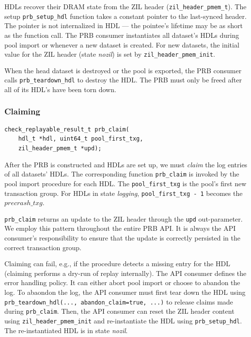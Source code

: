 \documentclass[12pt,a4paper,twoside]{book}
\begin{document}
HDLs recover their DRAM state from the ZIL header (\lstinline{zil_header_pmem_t}).
The setup \lstinline{prb_setup_hdl} function takes a constant pointer to the last-synced header.
The pointer is not internalized in HDL --- the pointee's lifetime may be as short as the function call.
The PRB consumer instantiates all dataset's HDLs during pool import or whenever a new dataset is created.
For new datasets, the initial value for the ZIL header (state \textit{nozil}) is set by \lstinline{zil_header_pmem_init}.

When the head dataset is destroyed or the pool is exported, the PRB consumer calls \lstinline{prb_teardown_hdl} to destroy the HDL.
The PRB must only be freed after all of its HDL's have been torn down.

\subsubsection{Claiming}\label{di:prb:api:claiming}

\begin{lstlisting}
check_replayable_result_t prb_claim(
    hdl_t *hdl, uint64_t pool_first_txg,
    zil_header_pmem_t *upd);
\end{lstlisting}

After the PRB is constructed and HDLs are set up, we must \textit{claim} the log entries of all datasets' HDLs.
The corresponding function \lstinline{prb_claim} is invoked by the pool import procedure for each HDL.
The \lstinline{pool_first_txg} is the pool's first new transaction group.
For HDLs in state \textit{logging}, \lstinline{pool_first_txg - 1} becomes the $precrash\_txg$.

\lstinline{prb_claim} returns an update to the ZIL header through the \lstinline{upd} out-parameter.
We employ this pattern throughout the entire PRB API.
It is always the API consumer's responsibility to ensure that the update is correctly persisted in the correct transaction group.

Claiming can fail, e.g., if the procedure detects a missing entry for the HDL (claiming performs a dry-run of replay internally).
The API consumer defines the error handling policy.
It can either abort pool import or choose to abandon the log.
To abaondon the log, the API consumer must first tear down the HDL using \lstinline{prb_teardown_hdl(..., abandon_claim=true, ...)} to release claims made during \lstinline{prb_claim}.
Then, the API consumer can reset the ZIL header content using \lstinline{zil_header_pmem_init} and re-instantiate the HDL using \lstinline{prb_setup_hdl}.
The re-instantiated HDL is in state \textit{nozil}.
\end{document}

